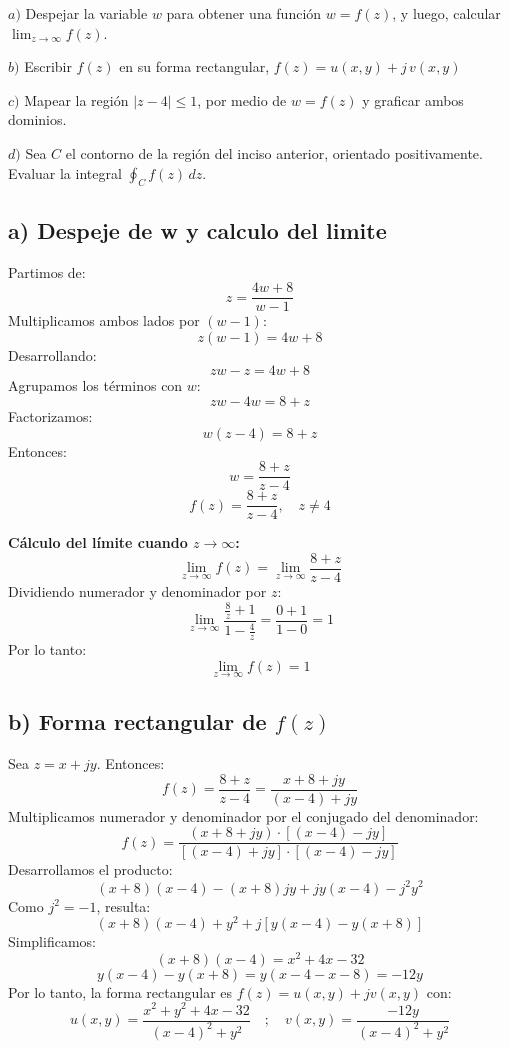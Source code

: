 \documentclass[a4paper, 12pt]{article}
\begin{document}
\vspace{0.4cm}

$a)$ Despejar la variable $w$ para obtener una función $w = f(z)$, y luego, calcular $\lim_{z \to \infty} f(z)$.

\vspace{0.4cm}

$b)$ Escribir $f(z)$ en su forma rectangular, $f(z) = u(x,y) + j\,v(x,y)$

\vspace{0.4cm}

$c)$ Mapear la región $|z - 4| \leq 1$, por medio de $w = f(z)$ y graficar ambos dominios.

\vspace{0.4cm}

$d)$ Sea $C$ el contorno de la región del inciso anterior, orientado positivamente. Evaluar la integral $\oint_C f(z)\, dz$.


        
	
	\subsection{a) Despeje de w y calculo del limite}
    Partimos de:
	\begin{equation}
		z=\frac{4w+8}{w-1}
	\end{equation}
	Multiplicamos ambos lados por $(w-1)$:
	\[ z(w-1) = 4w+8 \]
	Desarrollando:
	\[ zw - z = 4w +8 \]
	Agrupamos los términos con $w$:
	\[ zw - 4w = 8 + z \]
	Factorizamos:
	\[ w(z-4) = 8+z \]
	Entonces:
	\[ w = \frac{8+z}{z-4} \]
\begin{equation}
	\boxed{f(z) = \frac{8+z}{z-4}, \quad z \neq 4}
\end{equation}
		
	\textbf{Cálculo del límite cuando $z \to \infty$:}
	\[ \lim_{z \to \infty} f(z) = \lim_{z \to \infty} \frac{8+z}{z-4} \]
	Dividiendo numerador y denominador por $z$:
	\[ \lim_{z \to \infty} \frac{\frac{8}{z}+1}{1- \frac{4}{z}} = \frac{0+1}{1-0} = 1 \]
	Por lo tanto:
	\[ \boxed{\lim_{z \to \infty} f(z) = 1 }\]
	
\subsection{b) Forma rectangular de $f(z)$}

Sea $z = x + jy$. Entonces:
\[ f(z) = \frac{8+z}{z-4} = \frac{x+8 + jy}{(x-4) + jy} \]
Multiplicamos numerador y denominador por el conjugado del denominador:
\[ f(z) = \frac{(x+8 + jy) \cdot [(x-4) - jy]}{[(x-4) + jy] \cdot [(x-4) - jy]} \]
Desarrollamos el producto:
\[ (x+8)(x-4) - (x+8)jy + jy(x-4) - j^2y^2 \]
Como $j^2 = -1$, resulta:
\[ (x+8)(x-4)+ y^2 +j[y(x-4)- y(x+8)]  \]
Simplificamos:
\[ (x+8)(x-4) = x^2 +4x- 32 \]
\[ y(x-4) - y(x+8) = y(x-4-x-8) = -12y \]
Por lo tanto, la forma rectangular es $f(z) = u(x,y) + j v(x,y)$ con:
\[\boxed{ u(x,y) = \frac{x^2+y^2 +4x- 32}{(x-4)^2 + y^2} \quad ; \quad v(x,y) = \frac{-12y}{(x-4)^2 + y^2} } \]	
\newpage
\end{document}
